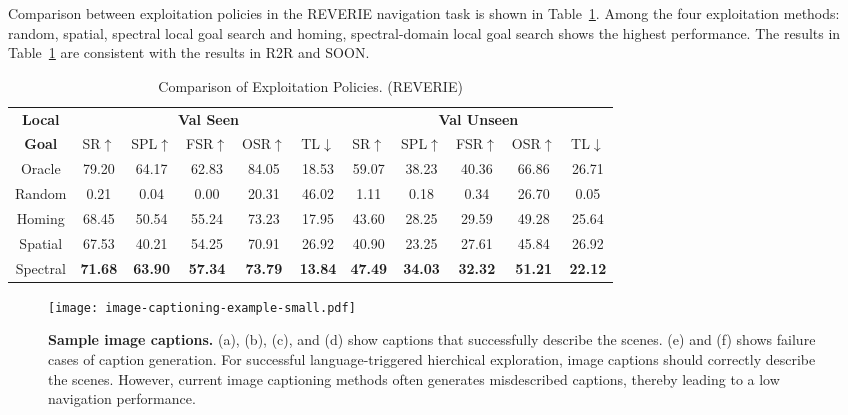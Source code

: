 \documentclass[10pt,twocolumn,letterpaper]{article}
\begin{document}
Comparison between exploitation policies in the REVERIE navigation task is shown in Table~\ref{tab:localgoal_compare_results-reverie}. Among the four exploitation methods: random, spatial, spectral local goal search and homing, spectral-domain local goal search shows the highest performance. The results in Table~\ref{tab:localgoal_compare_results-reverie} are consistent with the results in R2R and SOON.
\begin{table}[htb!]
\renewcommand{\arraystretch}{1.0}
\setlength{\tabcolsep}{2.2pt}
\fontsize{7}{8}\selectfont
\begin{tabular}{c|ccccc|ccccc}
\toprule
\textbf{Local} & \multicolumn{5}{c|}{\textbf{Val Seen}} & \multicolumn{5}{c}{\textbf{Val Unseen}}\\
\textbf{Goal} & SR$\uparrow$ & SPL$\uparrow$ & FSR$\uparrow$ & OSR$\uparrow$ & TL$\downarrow$ & SR$\uparrow$ & SPL$\uparrow$ & FSR$\uparrow$ & OSR$\uparrow$ & TL$\downarrow$ \\ \hline\hline
Oracle  & 79.20 & 64.17 & 62.83 & 84.05 & 18.53 & 59.07 & 38.23 & 40.36 & 66.86 & 26.71 \\ \hline
Random   & 0.21 & 0.04 & 0.00 & 20.31 & 46.02 & 1.11 & 0.18 & 0.34 & 26.70 & 0.05 \\
Homing   & 68.45 & 50.54 & 55.24 & 73.23 & 17.95 & 43.60 & 28.25 & 29.59 & 49.28 & 25.64 \\
Spatial  & 67.53 & 40.21 & 54.25 & 70.91 & 26.92 & 40.90 & 23.25 & 27.61 & 45.84 & 26.92 \\
\rowcolor{LightCyan}Spectral  & \textbf{71.68} & \textbf{63.90} & \textbf{57.34} & \textbf{73.79} & \textbf{13.84} & \textbf{47.49} & \textbf{34.03} & \textbf{32.32} & \textbf{51.21} & \textbf{22.12} \\
\bottomrule
\end{tabular}\vspace{-0.2cm}
\caption{\small Comparison of Exploitation Policies. (REVERIE)
}
\label{tab:localgoal_compare_results-reverie}\vspace{-0.2cm}
\end{table}

\begin{figure}[t!]{\centering\texttt{[image: image-captioning-example-small.pdf]}}\centering
\caption{{\textbf{Sample image captions.} (a), (b), (c), and (d) show captions that successfully describe the scenes. (e) and (f) shows failure cases of caption generation. For successful language-triggered hierchical exploration, image captions should correctly describe the scenes. However, current image captioning methods often generates misdescribed captions, thereby leading to a low navigation performance.
}}\label{fig:image-caption-example} \vspace{-0.5cm}
\end{figure}
\end{document}
